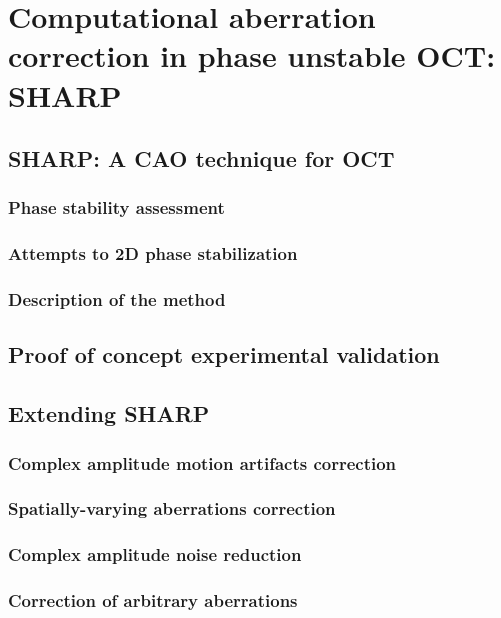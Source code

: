 \newpage
{}
\chapter[Computational aberration correction in phase unstable OCT: \\ SHARP]{Computational aberration correction in phase unstable OCT: SHARP}\label{chap:SHARP}

\section{SHARP: A CAO technique for OCT}

\subsection{Phase stability assessment}

\subsection{Attempts to 2D phase stabilization}

\subsection{Description of the method}

\section{Proof of concept experimental validation}

\section{Extending SHARP}

\subsection{Complex amplitude motion artifacts correction}

\subsection{Spatially-varying aberrations correction}

\subsection{Complex amplitude noise reduction}

\subsection{Correction of arbitrary aberrations}